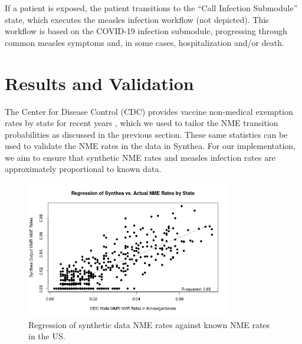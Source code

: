 \documentclass[12pt]{article}
\begin{document}
If a patient is exposed, the patient transitions to the ``Call Infection Submodule'' state, which executes the measles infection workflow (not depicted). %
This workflow is based on the COVID-19 infection submodule, progressing through common measles symptoms and, in some cases, hospitalization and/or death.  


\section{Results and Validation}

The Center for Disease Control (CDC) provides vaccine non-medical exemption rates by state for recent years \cite{vaccine-exemptions-cdc}, which we used to tailor the NME transition probabilities as discussed in the previous section.  These same statistics can be used to validate the NME rates in the data in Synthea.  For our implementation, we aim to ensure that synthetic NME rates and measles infection rates are approximately proportional to known data.

\begin{figure}[!htb]\centering
    \includegraphics[width=0.8\textwidth]{figures/nme_states_reg.png}
    \caption{Regression of synthetic data NME rates against known NME rates in the US. \label{fig: nme-state-regression}}
\end{figure}
\end{document}
